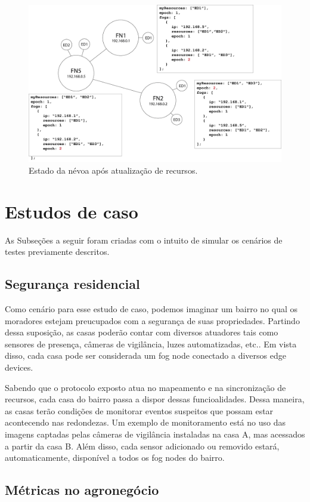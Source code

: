 \begin{figure}[H]
    \centering\includegraphics[width=.8\textwidth]{fig11.png} 
    \caption%
    {\label{fig:fig11} Estado da névoa após atualização de recursos.}
\end{figure}


\section{Estudos de caso}

As Subseções a seguir foram criadas com o intuito de simular os cenários de testes previamente descritos.

\subsection{Segurança residencial}

Como cenário para esse estudo de caso, podemos imaginar um bairro no qual os moradores estejam preucupados com a segurança de suas propriedades.
Partindo dessa suposição, as casas poderão contar com diversos atuadores tais como sensores de presença, câmeras de vigilância, luzes automatizadas, etc..
Em vista disso, cada casa pode ser considerada um fog node conectado a diversos edge devices.

Sabendo que o protocolo exposto atua no mapeamento e na sincronização de recursos, cada casa do bairro passa a dispor dessas funcioalidades.
Dessa maneira, as casas terão condições de monitorar eventos suspeitos que possam estar acontecendo nas redondezas.
Um exemplo de monitoramento está no uso das imagens captadas pelas câmeras de vigilância instaladas na casa A, mas acessados a partir da casa B.
Além disso, cada sensor adicionado ou removido estará, automaticamente, disponível a todos os fog nodes do bairro.


\subsection{Métricas no agronegócio}

